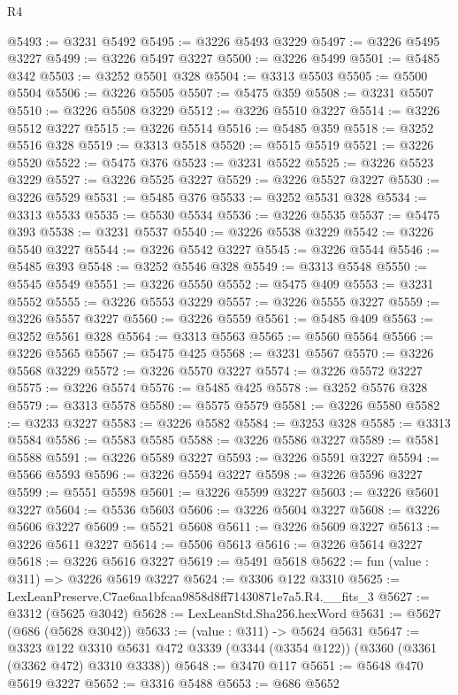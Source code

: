 \begin{lexlean}{R4}
\begin{coremodule}
@5493 := @3231 @5492
@5495 := @3226 @5493 @3229
@5497 := @3226 @5495 @3227
@5499 := @3226 @5497 @3227
@5500 := @3226 @5499
@5501 := @5485 @342
@5503 := @3252 @5501 @328
@5504 := @3313 @5503
@5505 := @5500 @5504
@5506 := @3226 @5505
@5507 := @5475 @359
@5508 := @3231 @5507
@5510 := @3226 @5508 @3229
@5512 := @3226 @5510 @3227
@5514 := @3226 @5512 @3227
@5515 := @3226 @5514
@5516 := @5485 @359
@5518 := @3252 @5516 @328
@5519 := @3313 @5518
@5520 := @5515 @5519
@5521 := @3226 @5520
@5522 := @5475 @376
@5523 := @3231 @5522
@5525 := @3226 @5523 @3229
@5527 := @3226 @5525 @3227
@5529 := @3226 @5527 @3227
@5530 := @3226 @5529
@5531 := @5485 @376
@5533 := @3252 @5531 @328
@5534 := @3313 @5533
@5535 := @5530 @5534
@5536 := @3226 @5535
@5537 := @5475 @393
@5538 := @3231 @5537
@5540 := @3226 @5538 @3229
@5542 := @3226 @5540 @3227
@5544 := @3226 @5542 @3227
@5545 := @3226 @5544
@5546 := @5485 @393
@5548 := @3252 @5546 @328
@5549 := @3313 @5548
@5550 := @5545 @5549
@5551 := @3226 @5550
@5552 := @5475 @409
@5553 := @3231 @5552
@5555 := @3226 @5553 @3229
@5557 := @3226 @5555 @3227
@5559 := @3226 @5557 @3227
@5560 := @3226 @5559
@5561 := @5485 @409
@5563 := @3252 @5561 @328
@5564 := @3313 @5563
@5565 := @5560 @5564
@5566 := @3226 @5565
@5567 := @5475 @425
@5568 := @3231 @5567
@5570 := @3226 @5568 @3229
@5572 := @3226 @5570 @3227
@5574 := @3226 @5572 @3227
@5575 := @3226 @5574
@5576 := @5485 @425
@5578 := @3252 @5576 @328
@5579 := @3313 @5578
@5580 := @5575 @5579
@5581 := @3226 @5580
@5582 := @3233 @3227
@5583 := @3226 @5582
@5584 := @3253 @328
@5585 := @3313 @5584
@5586 := @5583 @5585
@5588 := @3226 @5586 @3227
@5589 := @5581 @5588
@5591 := @3226 @5589 @3227
@5593 := @3226 @5591 @3227
@5594 := @5566 @5593
@5596 := @3226 @5594 @3227
@5598 := @3226 @5596 @3227
@5599 := @5551 @5598
@5601 := @3226 @5599 @3227
@5603 := @3226 @5601 @3227
@5604 := @5536 @5603
@5606 := @3226 @5604 @3227
@5608 := @3226 @5606 @3227
@5609 := @5521 @5608
@5611 := @3226 @5609 @3227
@5613 := @3226 @5611 @3227
@5614 := @5506 @5613
@5616 := @3226 @5614 @3227
@5618 := @3226 @5616 @3227
@5619 := @5491 @5618
@5622 := fun (value : @311) => @3226 @5619 @3227
@5624 := @3306 @122 @3310
@5625 := LexLeanPreserve.C7ae6aa1bfcaa9858d8ff71430871e7a5.R4.__fits_3
@5627 := @3312 (@5625 @3042)
@5628 := LexLeanStd.Sha256.hexWord
@5631 := @5627 (@686 (@5628 @3042))
@5633 := (value : @311) -> @5624 @5631
@5647 := @3323
    @122
    @3310
    @5631
    @472
    @3339
    (@3344 (@3354 @122))
    (@3360 (@3361 (@3362 @472) @3310 @3338))
@5648 := @3470 @117
@5651 := @5648 @470 @5619 @3227
@5652 := @3316 @5488
@5653 := @686 @5652

\end{coremodule}
\end{lexlean}
